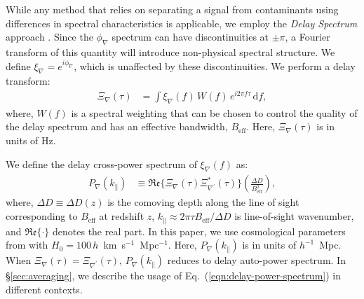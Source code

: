 \documentclass[
reprint,
superscriptaddress,
amsmath,
amssymb,
aps,
prd
]{revtex4-1}
\begin{document}
While any method that relies on separating a signal from contaminants using differences in spectral characteristics is applicable, we employ the {\it Delay Spectrum} approach \cite{par12a,par12b}. Since the $\phi_\nabla$ spectrum can have discontinuities at $\pm\pi$, a Fourier transform of this quantity will introduce non-physical spectral structure. We define $\xi_\nabla = e^{i\phi_\nabla}$, which is unaffected by these discontinuities. We perform a delay transform:
\begin{align}\label{eqn:cpdspec}
  \Xi_\nabla(\tau) &= \int \xi_\nabla(f)\,W(f)\,e^{i2\pi f\tau}\,\mathrm{d}f,
\end{align}
where, $W(f)$ is a spectral weighting that can be chosen to control the quality of the delay spectrum \citep{thy13,thy16} and has an effective bandwidth, $B_\textrm{eff}$. Here, $\Xi_\nabla(\tau)$ is in units of Hz. 

We define the delay cross-power spectrum of $\xi_\nabla(f)$ as:
\begin{align}
  P_\nabla(k_\parallel) &\equiv \mathfrak{Re}\bigg\{\Xi_\nabla(\tau)\Xi_{\nabla^\prime}^*(\tau)\bigg\} \left(\frac{\Delta D}{B_\textrm{eff}^2}\right), \label{eqn:delay-power-spectrum}
\end{align}
where, $\Delta D\equiv \Delta D(z)$ is the comoving depth along the line of sight corresponding to $B_\textrm{eff}$ at redshift $z$, $k_\parallel\approx 2\pi\tau B_\textrm{eff}/\Delta D$ is line-of-sight wavenumber, and $\mathfrak{Re}\{\cdot\}$ denotes the real part. In this paper, we use cosmological parameters from \cite{planck15xiii} with $H_0=100\,h$~km~s$^{-1}$~Mpc$^{-1}$. Here, $P_\nabla(k_\parallel)$ is in units of $h^{-1}$~Mpc. When $\Xi_\nabla(\tau)=\Xi_{\nabla^\prime}(\tau)$, $P_\nabla(k_\parallel)$ reduces to delay auto-power spectrum. In \S\ref{sec:averaging}, we describe the usage of Eq.~(\ref{eqn:delay-power-spectrum}) in different contexts. 
\end{document}

